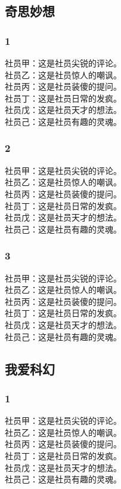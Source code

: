 \documentclass[9pt]{book}
\begin{document}
\begin{multicols}{2}
\mybackground
\setlength{\parindent}{0pt}
\subsection*{奇思妙想}
\subsubsection*{1}
社员甲：这是社员尖锐的评论。\\
社员乙：这是社员惊人的嘲讽。\\
社员丙：这是社员装傻的提问。\\
社员丁：这是社员日常的发疯。\\
社员戊：这是社员天才的想法。\\
社员己：这是社员有趣的灵魂。
\subsubsection*{2}
社员甲：这是社员尖锐的评论。\\
社员乙：这是社员惊人的嘲讽。\\
社员丙：这是社员装傻的提问。\\
社员丁：这是社员日常的发疯。\\
社员戊：这是社员天才的想法。\\
社员己：这是社员有趣的灵魂。
\subsubsection*{3}
社员甲：这是社员尖锐的评论。\\
社员乙：这是社员惊人的嘲讽。\\
社员丙：这是社员装傻的提问。\\
社员丁：这是社员日常的发疯。\\
社员戊：这是社员天才的想法。\\
社员己：这是社员有趣的灵魂。

\subsection*{我爱科幻}
\subsubsection*{1}
社员甲：这是社员尖锐的评论。\\
社员乙：这是社员惊人的嘲讽。\\
社员丙：这是社员装傻的提问。\\
社员丁：这是社员日常的发疯。\\
社员戊：这是社员天才的想法。\\
社员己：这是社员有趣的灵魂。

\end{multicols}
\end{document}
